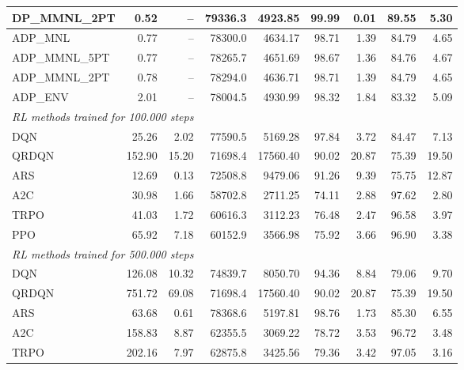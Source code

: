 \begin{samepage}
\begin{center}
\begin{tabular}{l|rr|rr|rr|rr}
    DP\_MMNL\_2PT &     0.52 &    -- &    79336.3 &    4923.85 &   99.99 &    0.01 &   89.55 &    5.30 \\
    \midrule
    ADP\_MNL     &     0.77 &    -- &    78300.0 &    4634.17 &   98.71 &    1.39 &   84.79 &    4.65 \\
    ADP\_MMNL\_5PT &     0.77 &    -- &    78265.7 &    4651.69 &   98.67 &    1.36 &   84.76 &    4.67 \\
    ADP\_MMNL\_2PT &     0.78 &    -- &    78294.0 &    4636.71 &   98.71 &    1.39 &   84.79 &    4.65 \\
    ADP\_ENV     &     2.01 &    -- &    78004.5 &    4930.99 &   98.32 &    1.84 &   83.32 &    5.09 \\
    \midrule
    \multicolumn{9}{l}{\textit{RL methods trained for 100.000 steps}} \\
    \midrule
    DQN          &    25.26 &     2.02 &    77590.5 &    5169.28 &   97.84 &    3.72 &   84.47 &    7.13 \\
    QRDQN        &   152.90 &    15.20 &    71698.4 &   17560.40 &   90.02 &   20.87 &   75.39 &   19.50 \\
    ARS          &    12.69 &     0.13 &    72508.8 &    9479.06 &   91.26 &    9.39 &   75.75 &   12.87 \\
    A2C          &    30.98 &     1.66 &    58702.8 &    2711.25 &   74.11 &    2.88 &   97.62 &    2.80 \\
    TRPO         &    41.03 &     1.72 &    60616.3 &    3112.23 &   76.48 &    2.47 &   96.58 &    3.97 \\
    PPO          &    65.92 &     7.18 &    60152.9 &    3566.98 &   75.92 &    3.66 &   96.90 &    3.38 \\
    \midrule
    \multicolumn{9}{l}{\textit{RL methods trained for 500.000 steps}} \\
    \midrule
    DQN          &   126.08 &    10.32 &    74839.7 &    8050.70 &   94.36 &    8.84 &   79.06 &    9.70 \\
    QRDQN        &   751.72 &    69.08 &    71698.4 &   17560.40 &   90.02 &   20.87 &   75.39 &   19.50 \\
    ARS          &    63.68 &     0.61 &    78368.6 &    5197.81 &   98.76 &    1.73 &   85.30 &    6.55 \\
    A2C          &   158.83 &     8.87 &    62355.5 &    3069.22 &   78.72 &    3.53 &   96.72 &    3.48 \\
    TRPO         &   202.16 &     7.97 &    62875.8 &    3425.56 &   79.36 &    3.42 &   97.05 &    3.16 \\

\end{tabular}
\end{center}
\end{samepage}
